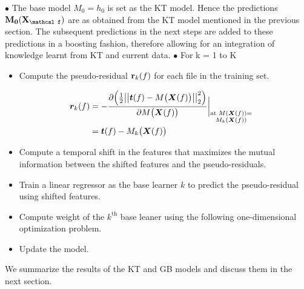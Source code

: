 \documentclass{article}
\begin{document}
$\bullet$ The base model $M_0 = h_0$ is set as the KT model. Hence the predictions $\bf M_0(\bf X_\mathcal f)$ are as obtained from the KT model mentioned in the previous section. The subsequent predictions in the next steps are added to these predictions in a boosting fashion, therefore allowing for an integration of knowledge learnt from KT and current data. 
$\bullet$ For k = 1 to K 

\begin{itemize}
\item Compute the pseudo-residual ${\bf r}_k(f)$ for each file in the training set. 	

\begin{equation} \label{pseudores}
\begin{aligned}
\hspace{-3mm}\bm r_k(f) &= - { \frac {\partial \Big({\frac{1}{2}\big|\big|\bm t(f) - M\big(\bm X(f)\big)\big|\big|^2_2}\Big)} {\partial M\big(\bm X(f)\big)} \bigg|}_{\substack{{\text{at }M(\bm X(f)) =} \\ {M_k(\bm X(f))}}}\\
&= \bm t(f) - M_k\big( \bm X(f) \big)
\end{aligned}
\end{equation}

\item Compute a temporal shift in the features that maximizes the mutual information between the shifted features and the pseudo-residuals.

\item Train a linear regressor as the base learner $k$ to predict the pseudo-residual using shifted features.

\item Compute weight of the $k^\text{th}$ base leaner using the following one-dimensional optimization problem.

\item Update the model. 

\end{itemize}

We summarize the results of the KT and GB models and discuss them in the next section.

%
\end{document}
